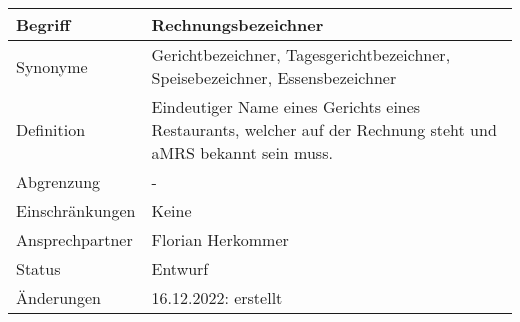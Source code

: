 \begin{table}[H]
    \centering
    \label{gls:Gerichtbezeichner}
    \begin{tabularx}{\textwidth}{| l | X |}
        \hline
        Begriff         & Rechnungsbezeichner                                                                                           \\
        \hline
        Synonyme        & Gerichtbezeichner, Tagesgerichtbezeichner, Speisebezeichner, Essensbezeichner                                 \\
        \hline
        Definition      & Eindeutiger Name eines Gerichts eines Restaurants, welcher auf der Rechnung steht und aMRS bekannt sein muss. \\
        \hline
        Abgrenzung      & -                                                                                                             \\
        \hline
        Einschränkungen & Keine                                                                                                         \\
        \hline
        Ansprechpartner & Florian Herkommer                                                                                             \\
        \hline
        Status          & Entwurf                                                                                                       \\
        \hline
        Änderungen      & 16.12.2022: erstellt                                                                                          \\
        \hline
    \end{tabularx}
\end{table}

